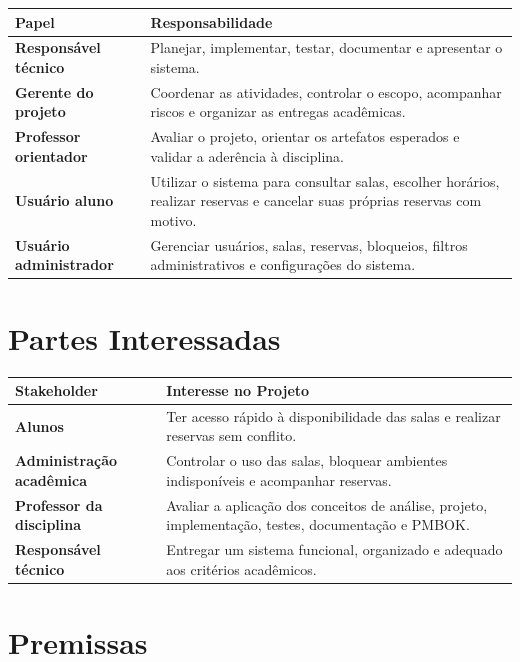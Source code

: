 \documentclass[12pt,a4paper]{article}
\begin{document}
\begin{longtable}{|p{5cm}|p{10cm}|}
\hline
\textbf{Papel} & \textbf{Responsabilidade} \\ \hline
\textbf{Responsável técnico} & Planejar, implementar, testar, documentar e apresentar o sistema. \\ \hline
\textbf{Gerente do projeto} & Coordenar as atividades, controlar o escopo, acompanhar riscos e organizar as entregas acadêmicas. \\ \hline
\textbf{Professor orientador} & Avaliar o projeto, orientar os artefatos esperados e validar a aderência à disciplina. \\ \hline
\textbf{Usuário aluno} & Utilizar o sistema para consultar salas, escolher horários, realizar reservas e cancelar suas próprias reservas com motivo. \\ \hline
\textbf{Usuário administrador} & Gerenciar usuários, salas, reservas, bloqueios, filtros administrativos e configurações do sistema. \\ \hline
\end{longtable}

\section{Partes Interessadas}

\begin{longtable}{|p{5cm}|p{10cm}|}
\hline
\textbf{Stakeholder} & \textbf{Interesse no Projeto} \\ \hline
\textbf{Alunos} & Ter acesso rápido à disponibilidade das salas e realizar reservas sem conflito. \\ \hline
\textbf{Administração acadêmica} & Controlar o uso das salas, bloquear ambientes indisponíveis e acompanhar reservas. \\ \hline
\textbf{Professor da disciplina} & Avaliar a aplicação dos conceitos de análise, projeto, implementação, testes, documentação e PMBOK. \\ \hline
\textbf{Responsável técnico} & Entregar um sistema funcional, organizado e adequado aos critérios acadêmicos. \\ \hline
\end{longtable}

\section{Premissas}
\end{document}
